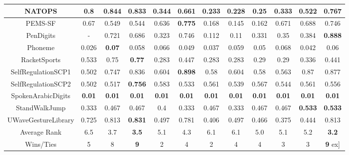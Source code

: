 \documentclass{svproc}
\begin{document}
\begin{table}[ht!]
\begin{adjustbox}{width=1.3\textwidth}
\begin{tabular}{||c@{\hskip 0.1in}c@{\hskip 0.1in}c@{\hskip 0.1in}c@{\hskip 0.1in}c@{\hskip 0.1in}c@{\hskip 0.1in}c@{\hskip 0.1in}c@{\hskip 0.1in}c@{\hskip 0.1in}c@{\hskip 0.1in}c@{\hskip 0.1in}c||}
    \hline
    NATOPS &  0.8 & \textbf{0.844} &0.833& 0.344 & 0.661 & 0.233 & 0.228 & 0.25 & 0.333 & 0.522 & 0.767 \\ 
    \hline
    PEMS-SF &  0.67 & 0.549 & 0.544& 0.636 & \textbf{0.775} & 0.168 & 0.145 & 0.162 & 0.671 & 0.688 & 0.746 \\ 
    \hline
    PenDigits &  - & 0.721 &0.686& 0.323 & 0.746 & 0.112 & 0.11 & 0.331 & 0.35 & 0.384 & \textbf{0.888} \\  
    \hline
    Phoneme &  0.026 & \textbf{0.07} & 0.058&0.066 & 0.049 & 0.037 & 0.059 & 0.05 & 0.068 & 0.042 & 0.06 \\ 
    \hline
    RacketSports &  0.533 & 0.75 &\textbf{0.77}& 0.283 & 0.447 & 0.283 & 0.283 & 0.29 & 0.29 & 0.336 & 0.441 \\  
    \hline
    SelfRegulationSCP1 &  0.502 & 0.747 &0.836& 0.604 & \textbf{0.898} & 0.58 & 0.604 & 0.58 & 0.563 & 0.87 & 0.877 \\  
    \hline
    SelfRegulationSCP2 &  0.502 & 0.517 &\textbf{0.756}& 0.583 & 0.533 & 0.561 & 0.539 & 0.567 & 0.544 & 0.561 & 0.556 \\ 
    \hline
    SpokenArabicDigits &  \textbf{0.01} & \textbf{0.01} &\textbf{0.01}& \textbf{0.01} & \textbf{0.01} & \textbf{0.01} & \textbf{0.01} & \textbf{0.01} & \textbf{0.01} & \textbf{0.01} & \textbf{0.01} \\ 
    \hline
    StandWalkJump &  0.333 & 0.467 &0.467& 0.4 & 0.333 & 0.467 & 0.333 & 0.467 & 0.467 & \textbf{0.533} & \textbf{0.533} \\ 
    \hline
    UWaveGestureLibrary&  0.725 & 0.813 &\textbf{0.831}& 0.497 & 0.781 & 0.406 & 0.497 & 0.466 & 0.375 & 0.444 & 0.813 \\  
    \hline
    \hline
    Average Rank & 6.5 & 3.7 & \textbf{3.5}& 5.1 & 4.3 & 6.1 & 6.1 & 5.0 & 5.1 & 5.2 & \textbf{3.2} \\
    \hline
    Wins/Ties &  5 & 8 & \textbf{9} & 2 & 4 & 2 & 4 & 4 & 3 & 3 & \textbf{9} \1ex]
    \hline
    \end{tabular}
    \end{adjustbox}
    \end{table}
\end{document}
